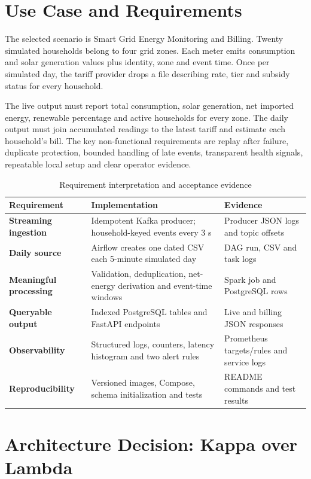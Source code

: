 \documentclass[11pt,a4paper]{article}
\begin{document}
\section{Use Case and Requirements}
The selected scenario is Smart Grid Energy Monitoring and Billing. Twenty simulated households belong to four grid zones. Each meter emits consumption and solar generation values plus identity, zone and event time. Once per simulated day, the tariff provider drops a file describing rate, tier and subsidy status for every household.

The live output must report total consumption, solar generation, net imported energy, renewable percentage and active households for every zone. The daily output must join accumulated readings to the latest tariff and estimate each household's bill. The key non-functional requirements are replay after failure, duplicate protection, bounded handling of late events, transparent health signals, repeatable local setup and clear operator evidence.

\begin{table}[H]\centering\small
\caption{Requirement interpretation and acceptance evidence}
\begin{tabularx}{\textwidth}{>{\bfseries}p{}X X}\toprule
Requirement & Implementation & Evidence \\\midrule
Streaming ingestion & Idempotent Kafka producer; household-keyed events every 3 s & Producer JSON logs and topic offsets\\
Daily source & Airflow creates one dated CSV each 5-minute simulated day & DAG run, CSV and task logs\\
Meaningful processing & Validation, deduplication, net-energy derivation and event-time windows & Spark job and PostgreSQL rows\\
Queryable output & Indexed PostgreSQL tables and FastAPI endpoints & Live and billing JSON responses\\
Observability & Structured logs, counters, latency histogram and two alert rules & Prometheus targets/rules and service logs\\
Reproducibility & Versioned images, Compose, schema initialization and tests & README commands and test results\\\bottomrule
\end{tabularx}\end{table}

\section{Architecture Decision: Kappa over Lambda}
\end{document}

